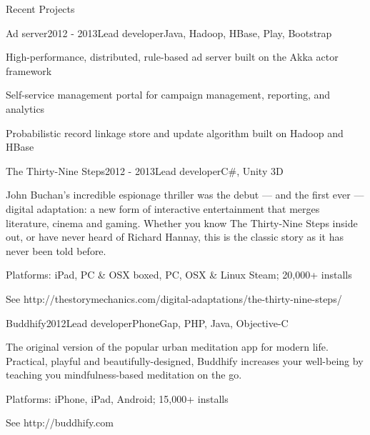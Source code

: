 \documentclass{resume} %
\begin{document}
\begin{rSection}{Recent Projects}
\begin{rSubsection}{Ad server}{2012 - 2013}{Lead developer}{Java, Hadoop, HBase, Play, Bootstrap}
\item High-performance, distributed, rule-based ad server built on the Akka actor framework
\item Self-service management portal for campaign management, reporting, and analytics
\item Probabilistic record linkage store and update algorithm built on Hadoop and HBase
\end{rSubsection}

\begin{rSubsection}{The Thirty-Nine Steps}{2012 - 2013}{Lead developer}{C\#, Unity 3D}
\item John Buchan’s incredible espionage thriller was the debut --- and the first ever --- digital adaptation: a new form of interactive entertainment that merges literature, cinema and gaming. Whether you know The Thirty-Nine Steps inside out, or have never heard of Richard Hannay, this is the classic story as it has never been told before.
\item Platforms: iPad, PC \& OSX boxed, PC, OSX \& Linux Steam; 20,000+ installs
\item See http://thestorymechanics.com/digital-adaptations/the-thirty-nine-steps/
\end{rSubsection}

\begin{rSubsection}{Buddhify}{2012}{Lead developer}{PhoneGap, PHP, Java, Objective-C}
\item The original version of the popular urban meditation app for modern life. Practical, playful and beautifully-designed, Buddhify increases your well-being by teaching you mindfulness-based meditation on the go.
\item Platforms: iPhone, iPad, Android; 15,000+ installs
\item See http://buddhify.com
\end{rSubsection}
\end{rSection}

\end{document}
